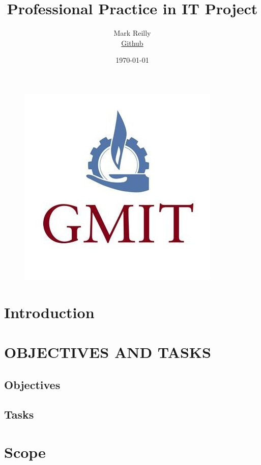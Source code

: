 \documentclass{article}
\title{Professional Practice in IT Project}
\author{
  Mark Reilly\\
  \href{https://github.com/MarkReillyGMIT}{Github}
}
\date{\today}
\begin{document}
\begin{figure}
    \centering
    \includegraphics[scale=0.3]{./images/gmit.jpg}
\end{figure}

\maketitle


\tableofcontents
\newpage


\section{Introduction}


\newpage

\section{OBJECTIVES AND TASKS}

\subsection{Objectives}

\subsection{Tasks}


\newpage

\section{Scope}
\end{document}
